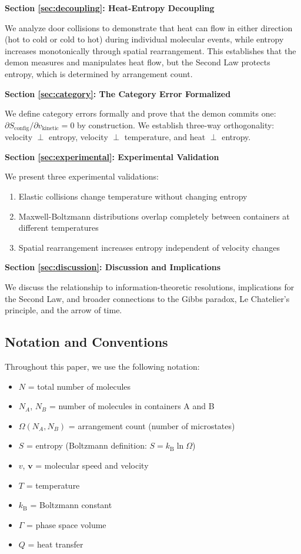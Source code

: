 \documentclass[10pt,twocolumn,letterpaper]{article}
\theoremstyle{definition}
\theoremstyle{remark}
\newcommand{\kb}{k_\text{B}}
\newcommand{\Om}{\Omega}
\begin{document}
\textbf{Section \ref{sec:decoupling}: Heat-Entropy Decoupling}

We analyze door collisions to demonstrate that heat can flow in either direction (hot to cold or cold to hot) during individual molecular events, while entropy increases monotonically through spatial rearrangement. This establishes that the demon measures and manipulates heat flow, but the Second Law protects entropy, which is determined by arrangement count.

\textbf{Section \ref{sec:category}: The Category Error Formalized}

We define category errors formally and prove that the demon commits one: $\partial S_{\text{config}}/\partial v_{\text{kinetic}} = 0$ by construction. We establish three-way orthogonality: velocity $\perp$ entropy, velocity $\perp$ temperature, and heat $\perp$ entropy.

\textbf{Section \ref{sec:experimental}: Experimental Validation}

We present three experimental validations:
\begin{enumerate}
\item Elastic collisions change temperature without changing entropy
\item Maxwell-Boltzmann distributions overlap completely between containers at different temperatures
\item Spatial rearrangement increases entropy independent of velocity changes
\end{enumerate}

\textbf{Section \ref{sec:discussion}: Discussion and Implications}

We discuss the relationship to information-theoretic resolutions, implications for the Second Law, and broader connections to the Gibbs paradox, Le Chatelier's principle, and the arrow of time.

\subsection{Notation and Conventions}

Throughout this paper, we use the following notation:
\begin{itemize}
\item $N$ = total number of molecules
\item $N_A$, $N_B$ = number of molecules in containers A and B
\item $\Om(N_A, N_B)$ = arrangement count (number of microstates)
\item $S$ = entropy (Boltzmann definition: $S = \kb \ln \Om$)
\item $v$, $\mathbf{v}$ = molecular speed and velocity
\item $T$ = temperature
\item $\kb$ = Boltzmann constant
\item $\Gamma$ = phase space volume
\item $Q$ = heat transfer
\end{itemize}
\end{document}
